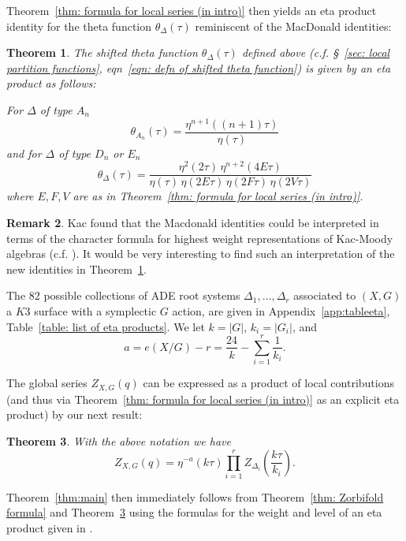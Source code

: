\documentclass{amsart}
\newtheorem{theorem}{Theorem}[section]
\theoremstyle{definition}
\newtheorem{remark}[theorem]{Remark}
\begin{document}
Theorem~\ref{thm: formula for local series (in intro)} then yields an
eta product identity for the theta function $\theta_{\Delta}(\tau )$
reminiscent of the MacDonald identities:
\begin{theorem}\label{thm: eta product for theta function}
The shifted theta function $\theta _{\Delta}(\tau )$ defined above
(c.f. \S~\ref{sec: local partition functions}, eqn~\eqref{eqn: defn of
shifted theta function}) is given by an eta product as follows:

For $\Delta$ of type $A_{n}$
\[
\theta_{A_{n}} (\tau ) = \frac{\eta^{n+1} ((n+1)\tau )}{\eta (\tau )}
\]
and for $\Delta$ of type $D_{n}$ or $E_{n}$ 
\[
\theta_{\Delta}(\tau ) = \frac{\eta^{2}(2\tau )\,\eta ^{n+2}(4E\tau
)}{\eta (\tau )\, \eta (2E\tau )\,\eta (2F\tau )\,\eta (2V\tau )}
\]
where $E,F,V$ are as in Theorem~\ref{thm: formula for local series (in intro)}.
\end{theorem}

\begin{remark}
Kac found that the Macdonald identities could be interpreted in terms
of the character formula for highest weight representations of
Kac-Moody algebras (c.f. \cite[\S~10]{kac1994infinite}). It would be
very interesting to find such an interpretation of the new identities in
Theorem~\ref{thm: eta product for theta function}.
\end{remark}


The 82 possible collections of ADE root systems $\Delta_{1},\dots
,\Delta_{r}$ associated to $(X,G)$ a $K3$ surface with a symplectic
$G$ action, are given in Appendix~\ref{app:tableeta},
Table~\ref{table: list of eta products}. We let $k=|G|$,
$k_{i}=|G_{i}|$, and
\[
a = e(X/G) - r=\frac{24}{k}-\sum_{i=1}^{r} \frac{1}{k_{i}}.
\]

The global series $Z_{X,G}(q)$ can be expressed as a product of local
contributions (and thus via Theorem~\ref{thm: formula for local series
(in intro)} as an explicit eta product) by our next result:
\begin{theorem}\label{thm: eta product formula for Z}
With the above notation we have
\[
Z_{X,G}(q) = \eta^{-a}(k\tau )\prod_{i=1}^{r}
Z_{\Delta_{i}}\left(\frac{k\tau}{k_{i}} \right).
\]
\end{theorem}

Theorem~\ref{thm:main} then immediately follows from Theorem~\ref{thm:
Zorbifold formula} and Theorem~\ref{thm: eta product formula for Z}
using the formulas for the weight and level of an eta product given in
\cite[\S~2.1]{kohler2011eta}.
\end{document}
